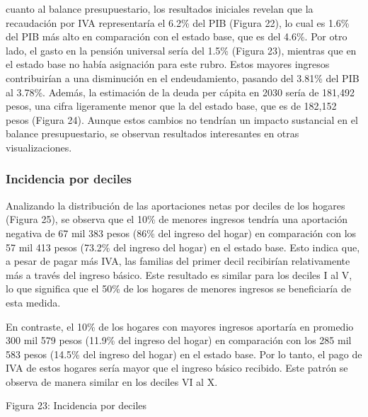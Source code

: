 cuanto al balance presupuestario, los resultados iniciales revelan que
la recaudación por IVA representaría el 6.2\% del PIB (Figura 22), lo
cual es 1.6\% del PIB más alto en comparación con el estado base, que es
del 4.6\%. Por otro lado, el gasto en la pensión universal sería del
1.5\% (Figura 23), mientras que en el estado base no había asignación
para este rubro. Estos mayores ingresos contribuirían a una disminución
en el endeudamiento, pasando del 3.81\% del PIB al 3.78\%. Además, la
estimación de la deuda per cápita en 2030 sería de 181,492 pesos, una
cifra ligeramente menor que la del estado base, que es de 182,152 pesos
(Figura 24). Aunque estos cambios no tendrían un impacto sustancial en
el balance presupuestario, se observan resultados interesantes en otras
visualizaciones.


\hypertarget{incidencia-por-deciles-1}{%
\subsubsection{Incidencia por deciles}\label{incidencia-por-deciles-1}}

Analizando la distribución de las aportaciones netas por deciles de los
hogares (Figura 25), se observa que el 10\% de menores ingresos tendría
una aportación negativa de 67 mil 383 pesos (86\% del ingreso del hogar)
en comparación con los 57 mil 413 pesos (73.2\% del ingreso del hogar)
en el estado base. Esto indica que, a pesar de pagar más IVA, las
familias del primer decil recibirían relativamente más a través del
ingreso básico. Este resultado es similar para los deciles I al V, lo
que significa que el 50\% de los hogares de menores ingresos se
beneficiaría de esta medida.

En contraste, el 10\% de los hogares con mayores ingresos aportaría en
promedio 300 mil 579 pesos (11.9\% del ingreso del hogar) en comparación
con los 285 mil 583 pesos (14.5\% del ingreso del hogar) en el estado
base. Por lo tanto, el pago de IVA de estos hogares sería mayor que el
ingreso básico recibido. Este patrón se observa de manera similar en los
deciles VI al X.

Figura 23: Incidencia por deciles

